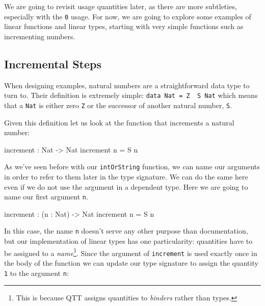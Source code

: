 \documentclass[
]{article}
\newenvironment{Shaded}{}{}
\newcommand{\DataTypeTok}[1]{\textcolor[rgb]{0.56,0.13,0.00}{#1}}
\newcommand{\NormalTok}[1]{#1}
\newcommand{\OperatorTok}[1]{\textcolor[rgb]{0.40,0.40,0.40}{#1}}
\newcommand{\OtherTok}[1]{\textcolor[rgb]{0.00,0.44,0.13}{#1}}
\begin{document}
We are going to revisit usage quantities later, as there are more
subtleties, especially with the \texttt{0} usage. For now, we are going
to explore some examples of linear functions and linear types, starting
with very simple functions such as incrementing numbers.

\hypertarget{incremental-steps}{%
\subsection{Incremental Steps}\label{incremental-steps}}

When designing examples, natural numbers are a straightforward data type
to turn to. Their definition is extremely simple:
\texttt{data\ Nat\ =\ Z\ \textbar{}\ S\ Nat} which means that a
\texttt{Nat} is either zero \texttt{Z} or the successor of another
natural number, \texttt{S}.

Given this definition let us look at the function that increments a
natural number:

\begin{Shaded}
\begin{Highlighting}[]
\NormalTok{increment }\OperatorTok{:} \DataTypeTok{Nat} \OtherTok{{-}\textgreater{}} \DataTypeTok{Nat}
\NormalTok{increment n }\OtherTok{=} \DataTypeTok{S}\NormalTok{ n}
\end{Highlighting}
\end{Shaded}

As we've seen before with our \texttt{intOrString} function, we can name
our arguments in order to refer to them later in the type signature. We
can do the same here even if we do not use the argument in a dependent
type. Here we are going to name our first argument \texttt{n}.

\begin{Shaded}
\begin{Highlighting}[]
\NormalTok{increment }\OperatorTok{:}\NormalTok{ (n }\OperatorTok{:} \DataTypeTok{Nat}\NormalTok{) }\OtherTok{{-}\textgreater{}} \DataTypeTok{Nat}
\NormalTok{increment n }\OtherTok{=} \DataTypeTok{S}\NormalTok{ n}
\end{Highlighting}
\end{Shaded}

In this case, the name \texttt{n} doesn't serve any other purpose than
documentation, but our implementation of linear types has one
particularity: quantities have to be assigned to a
\emph{name}\footnote{This is because QTT assigns quantities to
  \emph{binders} rather than types.}. Since the argument of
\texttt{increment} is used exactly once in the body of the function we
can update our type signature to assign the quantity \texttt{1} to the
argument \texttt{n}:
\end{document}
